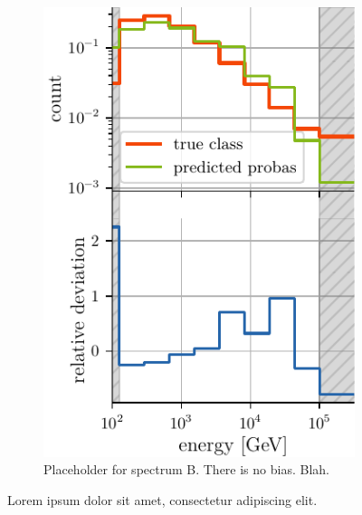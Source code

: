 \begin{figure}[H]
\begin{subfigure}{0.45\textwidth}
        \includegraphics[width=\textwidth]{content/plots/bootstrap:spectrum_half.pdf}
        \caption{
            Placeholder for spectrum B.
            There is no bias. Blah.
        }
    \end{subfigure}
    \caption{Lorem ipsum dolor sit amet, consectetur adipiscing elit.}
    \label{fig:bias_comparison}
\end{figure}

